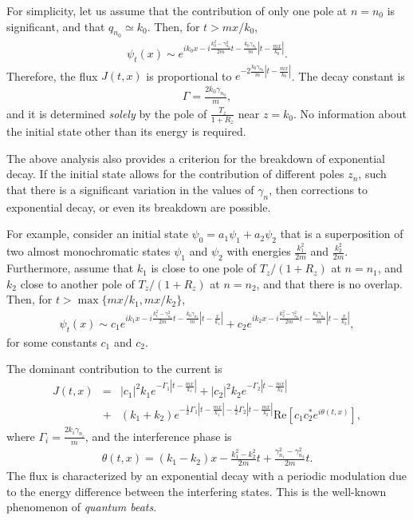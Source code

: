 \documentclass[12pt]{article}
\numberwithin{equation}{section}
\begin{document}
For simplicity, let us assume that the contribution of only one pole at $n = n_0$ is significant, and that $q_{n_0} \simeq k_0$. Then, for $t > mx/k_0$,
 \begin{eqnarray}
 \psi_t(x) \sim   e^{ik_0 x - i\frac{k_0^2-\gamma_{n_0}^2}{2m}t - \frac{k_0\gamma_{n_0}}{m}|t - \frac{mx}{k_0}|}.
 \end{eqnarray}
  Therefore, the flux $J(t, x)$ is proportional to $e^{-2 \frac{k_0\gamma_{n_0}}{m} |t - \frac{mx}{k_0}|}$. The decay constant is
  \begin{eqnarray}
  \Gamma = \frac{2k_0\gamma_{n_0}}{m}, \label{decaytb}
  \end{eqnarray}
   and it is determined {\em solely} by the pole of $\frac{T_z}{1+R_z} $ near $z = k_0$. No information about the initial state other than its energy is required.

The above analysis also provides a criterion for the breakdown of exponential decay. If the initial state allows for the contribution of different poles $z_n$, such that there is a significant variation in the values of $\gamma_n$, then corrections to exponential decay, or even its breakdown are possible.

For example, consider an initial state $ \psi_0 = a_1 \psi_1 + a_2 \psi_2$ that is a superposition of  two almost monochromatic states $\psi_1$ and $\psi_2$ with energies $\frac{k_1^2}{2m}$ and $\frac{k_2^2}{2m}$. Furthermore, assume that $k_1$ is close to   one pole of $T_z/(1+R_z)$ at $n = n_1$, and $k_2$ close to  another pole of $T_z/(1+R_z)$ at $n = n_2$, and that there is no overlap. Then, for $t > \max \{ mx/k_1, mx/k_2 \}$,
\begin{eqnarray}
 \psi_t(x) \sim c_1   e^{ik_1 x - i\frac{k_1^2-\gamma_{n_1}^2}{2m}t - \frac{k_0\gamma_{n_1}}{m}|t - \frac{x}{k_1}|} +
  c_2   e^{ik_2 x - i\frac{k_2^2-\gamma_{n_2}^2}{2m}t - \frac{k_0\gamma_{n_2}}{m}|t - \frac{x}{k_2}|},
\end{eqnarray}
for some constants $c_1$ and $c_2$.


The dominant contribution to the current is
\begin{eqnarray}
J(t, x)  &=& |c_1|^2 k_1 e^{- \Gamma_1 |t - \frac{mx}{k_1}|} + |c_2|^2 k_2 e^{- \Gamma_2 |t - \frac{mx}{k_2}|}
\nonumber \\
&+& (k_1 + k_2) e^{- \frac{1}{2} \Gamma_1 |t - \frac{mx}{k_1}| - \frac{1}{2} \Gamma_2 |t - \frac{mx}{k_2}| } \mbox{Re} \left[ c_1c_2^* e^{i \theta(t, x)}\right],
\end{eqnarray}
where   $\Gamma_i = \frac{2k_i\gamma_{n_i}}{m}$, and the interference phase is
\begin{eqnarray}
\theta(t, x) = (k_1 - k_2)x  - \frac{k_1^2 -k_2^2}{2m} t + \frac{\gamma_{n_1}^2 - \gamma_{n_2}^2}{2m}t.
\end{eqnarray}
The flux is characterized by an exponential decay with a periodic modulation due to the energy difference between the interfering states. This is the well-known phenomenon of {\em quantum beats}.
\end{document}
